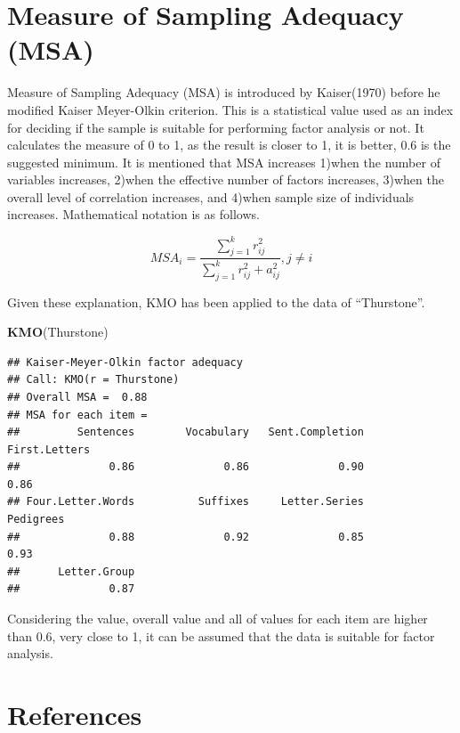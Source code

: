 \documentclass[]{book}
\newenvironment{Shaded}{\begin{snugshade}}{\end{snugshade}}
\newcommand{\KeywordTok}[1]{\textcolor[rgb]{0.13,0.29,0.53}{\textbf{#1}}}
\newcommand{\NormalTok}[1]{#1}
\begin{document}
\hypertarget{measure-of-sampling-adequacy-msa}{%
\section{Measure of Sampling Adequacy (MSA)}\label{measure-of-sampling-adequacy-msa}}

Measure of Sampling Adequacy (MSA) is introduced by Kaiser(1970) before he modified Kaiser Meyer-Olkin criterion. This is a statistical value used as an index for deciding if the sample is suitable for performing factor analysis or not. It calculates the measure of 0 to 1, as the result is closer to 1, it is better, 0.6 is the suggested minimum. It is mentioned that MSA increases 1)when the number of variables increases, 2)when the effective number of factors increases, 3)when the overall level of correlation increases, and 4)when sample size of individuals increases.
Mathematical notation is as follows.

\[
MSA_i =  \frac {\sum_{j=1}^k r_{ij}^2} {\sum_{j=1}^k r_{ij}^2 + a_{ij}^2} ,   j \ne i
\]

Given these explanation, KMO has been applied to the data of ``Thurstone''.

\begin{Shaded}
\begin{Highlighting}[]
\KeywordTok{KMO}\NormalTok{(Thurstone)}
\end{Highlighting}
\end{Shaded}

\begin{verbatim}
## Kaiser-Meyer-Olkin factor adequacy
## Call: KMO(r = Thurstone)
## Overall MSA =  0.88
## MSA for each item = 
##         Sentences        Vocabulary   Sent.Completion     First.Letters 
##              0.86              0.86              0.90              0.86 
## Four.Letter.Words          Suffixes     Letter.Series         Pedigrees 
##              0.88              0.92              0.85              0.93 
##      Letter.Group 
##              0.87
\end{verbatim}

Considering the value, overall value and all of values for each item are higher than 0.6, very close to 1, it can be assumed that the data is suitable for factor analysis.

\hypertarget{references-2}{%
\section{References}\label{references-2}}
\end{document}
